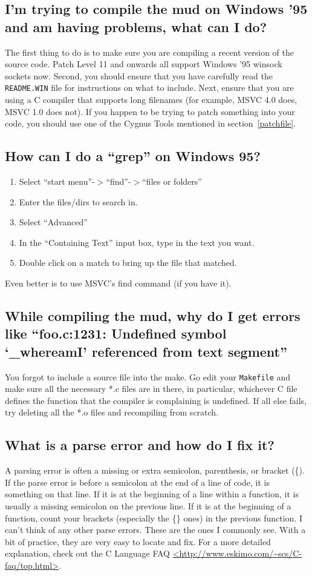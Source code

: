 \documentclass[11pt]{article}
\begin{document}
\subsection{I'm trying to compile the mud on Windows '95 and am having problems, what can I do?}
The first thing to do is to make sure you are compiling a recent version  of the source code.  Patch Level 11 and onwards all support Windows '95 winsock sockets now. Second, you should ensure that you have carefully read the \texttt{README.WIN} file for instructions on what to include.
Next, ensure that you are using a C compiler that supports long filenames (for example, MSVC 4.0 does, MSVC 1.0 does not). If you happen to be trying to patch something into your code, you should use one of the Cygnus Tools mentioned in section~\vref{patchfile}.

\subsection{How can I do a ``grep'' on Windows 95?}
\begin{enumerate}
\item Select ``start menu''-$>$``find''-$>$``files or folders''
\item Enter the files/dirs to search in.
\item Select ``Advanced''
\item In the ``Containing Text'' input box, type in the text you want.
\item Double click on a match to bring up the file that matched. 
\end{enumerate}
Even better is to use MSVC's find command (if you have it).

\subsection{While compiling the mud, why do I get errors like ``foo.c:1231: Undefined symbol `\_whereamI' referenced from text segment''}
You forgot to include a source file into the make.  Go edit your \texttt{Makefile} and make sure all the necessary *.c files are in there, in particular, whichever C file defines the function that the compiler is complaining is undefined.  If all else fails, try deleting all the *.o files and recompiling from scratch. 

\subsection{What is a parse error and how do I fix it?}
A parsing error is often a missing or extra semicolon, parenthesis, or bracket (\{). If the parse error is before a semicolon at the end of a line of code, it is something on that line. If it is at the beginning of a line within a function, it is usually a missing semicolon on the previous line. If it is at the beginning of a function, count your brackets (especially  the \{\} ones) in the previous function. I can't think of any other parse errors.  These are the ones I commonly see.  With a bit of practice, they are very easy to locate and fix.  For a more detailed explanation, check out the C Language FAQ \url{<http://www.eskimo.com/~scs/C-faq/top.html>}.
\end{document}
